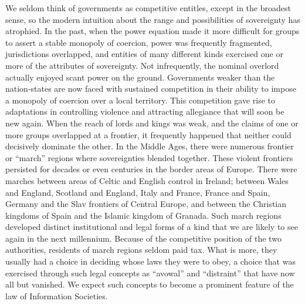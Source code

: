\begin{paracol}{2}
\switchcolumn
We seldom think of governments as competitive entitles, except in the broadest sense, so the modern intuition about the range and possibilities of sovereignty has atrophied. In the past, when the power equation made it more difficult for groups to assert a stable monopoly of coercion, power was frequently fragmented, jurisdictions overlapped, and entities of many different kinds exercised one or more of the attributes of sovereignty. Not infrequently, the nominal overlord actually enjoyed scant power on the ground. Governments weaker than the nation-states are now faced with sustained competition in their ability to impose a monopoly of coercion over a local territory. This competition gave rise to adaptations in controlling violence and attracting allegiance that will soon be new again.   When the reach of lords and kings was weak, and the claims of one or more groups overlapped at a frontier, it frequently happened that neither could decisively dominate the other. In the Middle Ages, there were numerous frontier or ``march'' regions where sovereignties blended together. These violent frontiers persisted for decades or even centuries in the border areas of Europe. There were marches between areas of Celtic and English control in Ireland; between Wales and England, Scotland and England, Italy and France, France and Spain, Germany and the Slav frontiers of Central Europe, and between the Christian kingdoms of Spain and the Islamic kingdom of Granada. Such march regions developed distinct institutional and legal forms of a kind that we are likely to see again in the next millennium. Because of the competitive position of the two authorities, residents of march regions seldom paid tax. What is more, they usually had a choice in deciding whose laws they were to obey, a choice that was exercised through such legal concepts as ``avowal'' and ``distraint'' that have now all but vanished. We expect such concepts to become a prominent feature of the law of Information Societies.
\end{paracol}

